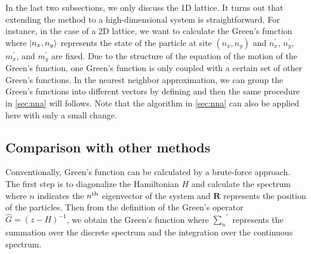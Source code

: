 In the last two subsections, we only discuss the 1D lattice. It turns out that extending the method to a high-dimensional system is 
straightforward. For instance, in the case of a 2D lattice, we 
want to calculate the Green's function 
where $| n_x, n_y \rangle$ represents the state of the particle at site $(n_x, n_y)$ and $n_x^{\prime}$, $n_y^{\prime}$,
$m_x^{\prime}$, and $m_y^{\prime}$ are fixed. Due to the structure of the equation of the 
motion of the Green's function, one Green's function is only coupled with a certain set of other Green's functions. In the
nearest neighbor approximation, we can group the Green's functions into different vectors by defining
and then the same procedure in \autoref{sec:nna} will follows. Note that the algorithm in \autoref{sec:nna} can also
be applied here with only a small change.  

\subsection{Comparison with other methods}
\label{sec:comparison}

Conventionally, Green's function can be calculated by a brute-force approach. The first step is to diagonalize the 
Hamiltonian $H$ and calculate the spectrum
where $n$ indicates the $n^{\rm th}$ eigenvector of the system and $\mathbf{R}$ represents the position of the
particles. Then from the definition of the Green's operator $\hat{G} = (z-H)^{-1}$, we obtain the Green's function
where ${\sum_{n}}^{\prime}$ represents  the summation over the discrete spectrum and the integration over the
 continuous spectrum. 


